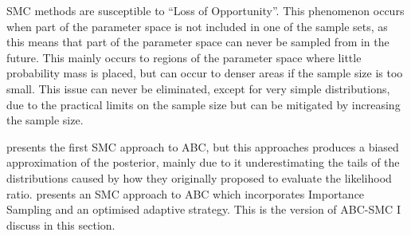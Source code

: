 \documentclass[11pt,a4paper]{article}
\theoremstyle{break}
\begin{document}
  \par SMC methods are susceptible to ``Loss of Opportunity''. This phenomenon occurs when part of the parameter space is not included in one of the sample sets, as this means that part of the parameter space can never be sampled from in the future. This mainly occurs to regions of the parameter space where little probability mass is placed, but can occur to denser areas if the sample size is too small. This issue can never be eliminated, except for very simple distributions, due to the practical limits on the sample size but can be mitigated by increasing the sample size.

  \par \cite[]{SMC_wo_likelihood} presents the first SMC approach to ABC, but this approaches produces a biased approximation of the posterior, mainly due to it underestimating the tails of the distributions caused by how they originally proposed to evaluate the likelihood ratio. \cite[]{adaptive_ABC} presents an SMC approach to ABC which incorporates Importance Sampling and an optimised adaptive strategy. This is the version of ABC-SMC I discuss in this section.
\end{document}
